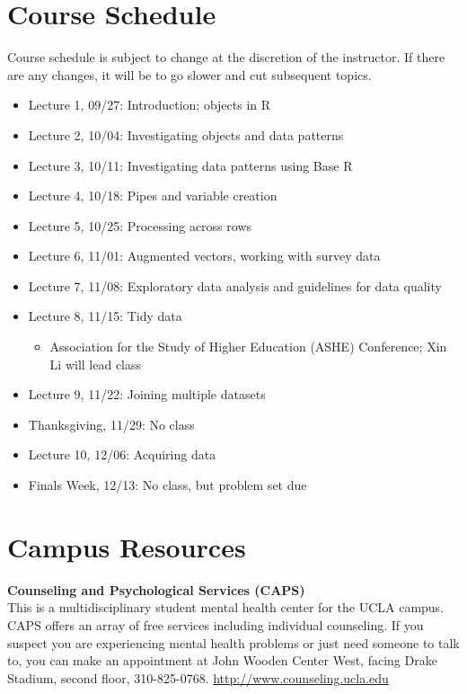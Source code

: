 \documentclass[11pt,]{article}
\providecommand{\tightlist}{%
  \setlength{\itemsep}{0pt}\setlength{\parskip}{0pt}}
\begin{document}
\hypertarget{course-schedule}{%
\section{Course Schedule}\label{course-schedule}}

Course schedule is subject to change at the discretion of the
instructor. If there are any changes, it will be to go slower and cut
subsequent topics.

\begin{itemize}
\item
  Lecture 1, 09/27: Introduction; objects in R
\item
  Lecture 2, 10/04: Investigating objects and data patterns
\item
  Lecture 3, 10/11: Investigating data patterns using Base R
\item
  Lecture 4, 10/18: Pipes and variable creation
\item
  Lecture 5, 10/25: Processing across rows
\item
  Lecture 6, 11/01: Augmented vectors, working with survey data
\item
  Lecture 7, 11/08: Exploratory data analysis and guidelines for data
  quality
\item
  Lecture 8, 11/15: Tidy data

  \begin{itemize}
  \tightlist
  \item
    Association for the Study of Higher Education (ASHE) Conference; Xin
    Li will lead class
  \end{itemize}
\item
  Lecture 9, 11/22: Joining multiple datasets
\item
  Thanksgiving, 11/29: No class
\item
  Lecture 10, 12/06: Acquiring data
\item
  Finals Week, 12/13: No class, but problem set due
\end{itemize}

\hypertarget{campus-resources}{%
\section{Campus Resources}\label{campus-resources}}

\textbf{Counseling and Psychological Services (CAPS)}\\
This is a multidisciplinary student mental health center for the UCLA
campus. CAPS offers an array of free services including individual
counseling. If you suspect you are experiencing mental health problems
or just need someone to talk to, you can make an appointment at John
Wooden Center West, facing Drake Stadium, second floor, 310-825-0768.
\url{http://www.counseling.ucla.edu}
\end{document}

